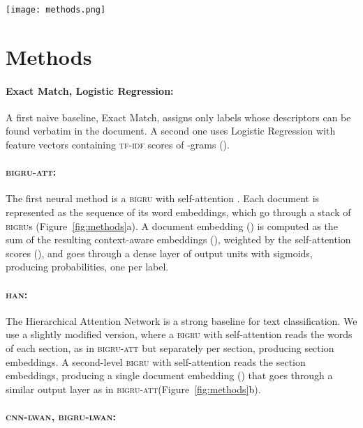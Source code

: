 \documentclass[11pt,a4paper]{article}
\newcommand{\bigruatt}{\textsc{bigru-att}\xspace}
\newcommand{\bigru}{\textsc{bigru}\xspace}
\newcommand{\han}{\textsc{han}\xspace}
\newcommand{\lwancnn}{\textsc{cnn-lwan}\xspace}
\newcommand{\lwangru}{\textsc{bigru-lwan}\xspace}
\newcommand{\bert}{\textsc{bert}\xspace}
\newcommand{\tfidf}{\textsc{tf-idf}\xspace}
\begin{document}
\begin{figure*}[ht]
  \centering
    \texttt{[image: methods.png]}
  \caption{Illustration of (a) \bigruatt, (b) \han, (c) \lwangru, and (d) \bert.}
  \vspace*{-4mm}
  \label{fig:methods}
\end{figure*}

\section{Methods}
\label{sec:methods}

\paragraph{Exact Match, Logistic Regression:} 
A first naive baseline, Exact Match, assigns only labels whose descriptors can be found verbatim in the document. A second one uses Logistic Regression with feature vectors containing \tfidf scores of -grams ().

\paragraph{\bigruatt:}

The first neural method is a \textsc{bigru} with self-attention \cite{Xu2015}. Each document is represented as the sequence of its word embeddings, which go through a stack of \textsc{bigru}s (Figure~\ref{fig:methods}a). A document embedding () is computed as the sum of the resulting context-aware embeddings (), weighted by the self-attention scores (), and goes through a dense layer of  output units with sigmoids, producing  probabilities, one per label.

\paragraph{\han:}

The Hierarchical Attention Network \cite{Yang2016} is a strong baseline for text classification. We use a slightly modified version, where a \bigru with self-attention reads the words of each section, as in \bigruatt but separately per section, producing section embeddings. A second-level \bigru with self-attention reads the section embeddings, producing a single document embedding () that goes through a similar output layer as in \bigruatt (Figure~\ref{fig:methods}b).

\paragraph{\lwancnn, \lwangru:}
\end{document}
